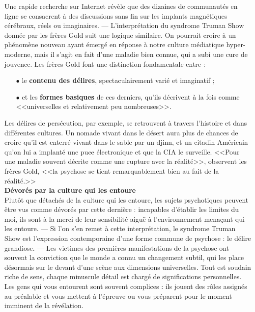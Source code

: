 \documentclass[11pt,twoside,a4paper]{article}
\begin{document}
Une rapide recherche sur Internet r{\'e}v{\`e}le que des dizaines de communaut{\'e}s en ligne se consacrent {\`a} des discussions sans fin sur les implants magn{\'e}tiques c{\'e}r{\'e}braux, r{\'e}els ou imaginaires. --- L'interpr{\'e}tation du syndrome Truman Show donn{\'e}e par les fr{\`e}res Gold suit une logique similaire. On pourrait croire {\`a} un ph{\'e}nom{\`e}ne nouveau ayant {\'e}merg{\'e} en r{\'e}ponse {\`a} notre culture m{\'e}diatique hyper-moderne, mais il s'agit en fait d'une maladie bien connue, qui a subi une cure de jouvence. Les fr{\`e}res Gold font une distinction fondamentale entre :
\begin{itemize}
    \item[$\bullet$] le \textbf{contenu des d{\'e}lires}, spectaculairement vari{\'e} et imaginatif ;
    \item[$\bullet$] et les \textbf{formes basiques} de ces derniers, qu'ils d{\'e}crivent {\`a} la fois comme <<universelles et relativement peu nombreuses>>.
\end{itemize} %

Les d{\'e}lires de pers{\'e}cution, par exemple, se retrouvent {\`a} travers l'histoire et dans diff{\'e}rentes cultures. Un nomade vivant dans le d{\'e}sert aura plus de chances de croire qu'il est enterr{\'e} vivant dans le sable par un djinn, et un citadin Am{\'e}ricain qu'on lui a implant{\'e} une puce {\'e}lectronique et que la CIA le surveille. <<Pour une maladie souvent d{\'e}crite comme une rupture avec la r{\'e}alit{\'e}>>, observent les fr{\`e}res Gold, <<la psychose se tient remarquablement bien au fait de la r{\'e}alit{\'e}.>>~\\

\textbf{\Large D{\'e}vor{\'e}s par la culture qui les entoure}~\\

Plut{\^o}t que d{\'e}tach{\'e}s de la culture qui les entoure, les sujets psychotiques peuvent {\^e}tre vus comme d{\'e}vor{\'e}s par cette derni{\`e}re : incapables d'{\'e}tablir les limites du moi, ils sont {\`a} la merci de leur sensibilit{\'e} aigu{\"e} {\`a} l'environnement mena\c{c}ant qui les entoure. --- Si l'on s'en remet {\`a} cette interpr{\'e}tation, le syndrome Truman Show est l'expression contemporaine d'une forme commune de psychose : le d{\'e}lire grandiose. --- Les victimes des premi{\`e}res manifestations de la psychose ont souvent la conviction que le monde a connu un changement subtil, qui les place d{\'e}sormais sur le devant d'une sc{\`e}ne aux dimensions universelles. Tout est soudain riche de sens, chaque minuscule d{\'e}tail est charg{\'e} de significations personnelles. Les gens qui vous entourent sont souvent complices : ils jouent des r{\^o}les assign{\'e}s au pr{\'e}alable et vous mettent {\`a} l'{\'e}preuve ou vous pr{\'e}parent pour le moment imminent de la r{\'e}v{\'e}lation.~\\
\end{document}
